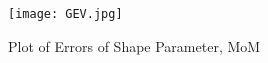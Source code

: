 \documentclass{article}
\begin{document}
\begin{figure}
\texttt{[image: GEV.jpg]}
\caption{Plot of Errors of Shape Parameter, MoM}
\label{fig:errorsMoM2}
\end{figure}

\end{document}
